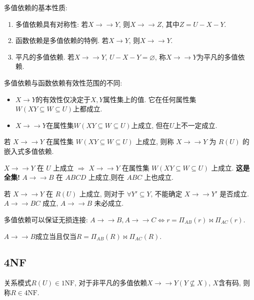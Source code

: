 多值依赖的基本性质:
\begin{enumerate}
    \item 多值依赖具有对称性: 若$X\to\to Y$, 则$X\to\to Z$, 其中$Z=U-X-Y$.
    \item 函数依赖是多值依赖的特例. 若$X\to Y$, 则$X\to\to Y$.
    \item 平凡的多值依赖. 若$X\to\to Y$, $U-X-Y=\varnothing$, 称$X\to\to Y$为平凡的多值依赖.
\end{enumerate}

多值依赖与函数依赖有效性范围的不同:
\begin{itemize}
  \item $X\to Y$的有效性仅决定于$X,Y$属性集上的值. 它在任何属性集$W(XY\subseteq W\subseteq U)$上都成立.
  \item $X\to\to Y$在属性集$W(XY\subseteq W\subseteq U)$上成立, 但在$U$上不一定成立.
\end{itemize}

\begin{definition}[嵌入式多值依赖]
  若 $X \to\to Y$ 在属性集 $W (XY \subseteq W \subseteq U)$ 上成立,
则称 $X \to\to Y$ 为 $R(U)$ 的嵌入式多值依赖.
\end{definition}

\begin{remark}
  $X \to\to Y$ 在 $U$ 上成立 $\Rightarrow$ $X \to\to Y$ 在属性集 $W (XY \subseteq W \subseteq U)$ 上成立. \textbf{这是全集!} $A \to\to B$ 在 $ABCD$ 上成立,则在 $ABC$ 上也成立.

  若 $X \to\to Y$ 在 $R(U)$ 上成立,
  则对于 $\forall Y' \subseteq Y$, 不能确定 $X \to\to Y'$ 是否成立.
  $A \to\to BC$ 成立, $A \to\to B$ 未必成立.
\end{remark}


多值依赖可以保证无损连接: $A\to\to B,A\to\to C \Leftrightarrow r = \Pi_{AB}(r) \bowtie \Pi_{AC}(r)$.

\begin{theorem}[多值依赖成立]
  $A\to\to B$成立当且仅当$R = \Pi_{AB}(R) \bowtie \Pi_{AC}(R)$.
\end{theorem}

\subsection{4NF}

\begin{definition}[4NF]
  关系模式$R(U)\in \text{1NF}$, 对于非平凡的多值依赖$X\to\to Y (Y\nsubseteq X)$, $X$含有码, 则称$R\in\text{4NF}$.
\end{definition}

